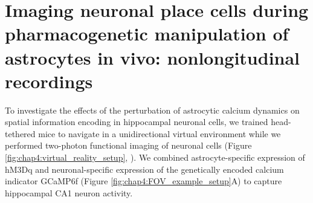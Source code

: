 \section{Imaging neuronal place cells during pharmacogenetic manipulation of astrocytes in vivo: nonlongitudinal recordings}
\label{chap4:sec:3:linear_track}
To investigate the effects of the perturbation of astrocytic calcium dynamics on spatial information encoding in hippocampal neuronal cells, we trained head-tethered mice to navigate in a unidirectional virtual environment while we performed two-photon functional imaging of neuronal cells (Figure \ref{fig:chap4:virtual_reality_setup}, \cite{saleem2018coherent}). 
We combined astrocyte-specific expression of hM3Dq and neuronal-specific expression of the genetically encoded calcium indicator GCaMP6f (Figure \ref{fig:chap4:FOV_example_setup}A) to capture hippocampal CA1 neuron activity.
